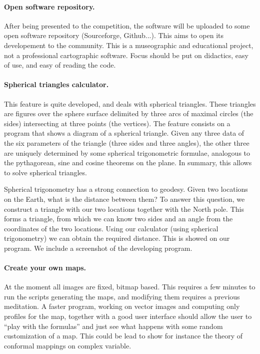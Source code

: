 \documentclass[a4paper,12pt]{article}
\begin{document}
\paragraph{Open software repository.} After being presented to the competition, the software will be uploaded to some open software
repository (Sourceforge, Github...). This aims to open its developement to the community. This is a museographic and educational project,
not a professional cartographic software. Focus should be put on didactics, easy of use, and easy of reading the code. 

\paragraph{Spherical triangles calculator.} This feature is quite developed, and deals with spherical triangles. These triangles are figures over the sphere surface delimited by three arcs of maximal circles (the sides) intersecting at three points (the vertices). The feature consists on a program that shows a diagram of a spherical triangle. Given any three data of the six parameters of the triangle (three sides and three angles), the other three are uniquely determined by some spherical trigonometric formulae, analogous to the pythagorean, sine and cosine theorems on the plane. In summary, this allows to solve spherical triangles. 

Spherical trigonometry has a strong connection to geodesy. Given two locations on the Earth, what is the distance between them? To answer this question, we construct a triangle with our two locations together with the North pole. This forms a triangle, from which we can know two sides and an angle from the coordinates of the two locations. Using our calculator (using spherical trigonometry) we can obtain the required distance. This is showed on our program. We include a screenshot of the developing program.

\paragraph{Create your own maps.} At the moment all images are fixed, bitmap based. This requires a few minutes to run the scripts generating the maps, and modifying them requires a previous meditation. A faster program, working on vector images and computing only profiles for the map, together with a good user interface should allow the user to ``play with the formulas'' and just see what happens with some random customization of a map. This could be lead to show for instance the theory of conformal mappings on complex variable.
\end{document}
